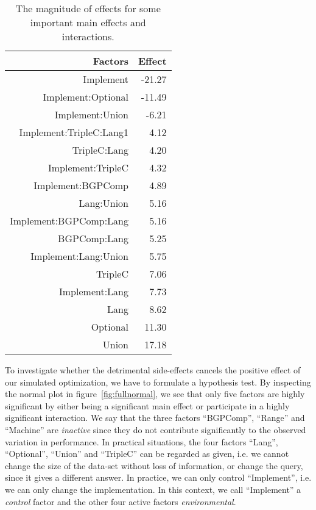 \documentclass{llncs}
\begin{document}
\begin{table}[hb]
\begin{center}
\caption{The magnitude of effects for some important main effects and interactions.}\label{tab:effects}
\begin{tabular}{rr}
  \hline
Factors & Effect  \\ 
  \hline
Implement & -21.27 \\ 
  Implement:Optional & -11.49 \\ 
  Implement:Union & -6.21 \\ 
  Implement:TripleC:Lang1 & 4.12 \\ 
  TripleC:Lang & 4.20 \\ 
  Implement:TripleC & 4.32 \\ 
  Implement:BGPComp & 4.89 \\ 
  Lang:Union & 5.16 \\ 
  Implement:BGPComp:Lang & 5.16 \\ 
  BGPComp:Lang & 5.25 \\ 
  Implement:Lang:Union & 5.75 \\ 
  TripleC & 7.06 \\ 
  Implement:Lang & 7.73 \\ 
  Lang & 8.62 \\ 
  Optional & 11.30 \\ 
  Union & 17.18 \\ 
   \hline
\end{tabular}
\end{center}
\end{table}


To investigate whether the detrimental side-effects cancels the
positive effect of our simulated optimization, we have to formulate a
hypothesis test. By inspecting the normal plot in
figure~\ref{fig:fullnormal}, we see that only five factors are highly
significant by either being a significant main effect or participate
in a highly significant interaction. We say that the three factors
``BGPComp'', ``Range'' and ``Machine'' are \emph{inactive} since they
do not contribute significantly to the observed variation in
performance. In practical situations, the four factors ``Lang'',
``Optional'', ``Union'' and ``TripleC'' can be regarded as given,
i.e. we cannot change the size of the data-set without loss of
information, or change the query, since it gives a different
answer. In practice, we can only control ``Implement'', i.e. we can
only change the implementation. In this context, we call ``Implement''
a \emph{control} factor and the other four active factors
\emph{environmental}.
\end{document}
